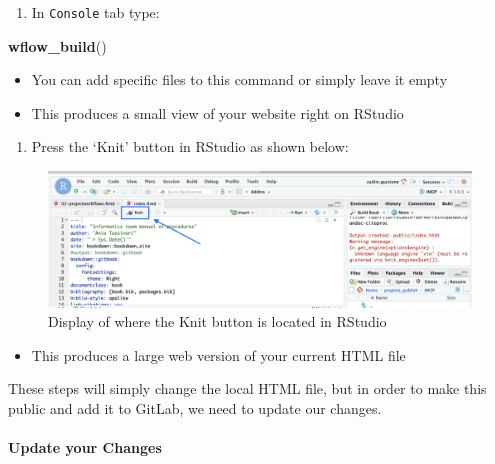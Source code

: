 \documentclass[openany]{article}
\newenvironment{Shaded}{\begin{snugshade}}{\end{snugshade}}
\newcommand{\KeywordTok}[1]{\textcolor[rgb]{0.13,0.29,0.53}{\textbf{#1}}}
\newcommand{\NormalTok}[1]{#1}
\providecommand{\tightlist}{%
  \setlength{\itemsep}{0pt}\setlength{\parskip}{0pt}}
\let\oldparagraph\paragraph
\renewcommand{\paragraph}[1]{\oldparagraph{#1}\mbox{}}
\begin{document}
\begin{enumerate}
\def\labelenumi{\arabic{enumi}.}
\tightlist
\item
  In \texttt{Console} tab type:
\end{enumerate}

\begin{Shaded}
\begin{Highlighting}[]
\KeywordTok{wflow_build}\NormalTok{()}
\end{Highlighting}
\end{Shaded}

\begin{itemize}
\tightlist
\item
  You can add specific files to this command or simply leave it empty
\item
  This produces a small view of your website right on RStudio
\end{itemize}

\begin{enumerate}
\def\labelenumi{\arabic{enumi}.}
\setcounter{enumi}{1}
\tightlist
\item
  Press the `Knit' button in RStudio as shown below:
\end{enumerate}

\begin{figure}

{\centering \includegraphics[width=0.8\linewidth]{images/Workflow_Photos/knit_arrow} 

}

\caption{ Display of where the Knit button is located in RStudio}\label{fig:d2}
\end{figure}

\begin{itemize}
\tightlist
\item
  This produces a large web version of your current HTML file
\end{itemize}

These steps will simply change the local HTML file, but in order to make this public and add it to GitLab, we need to update our changes.

\hypertarget{update-your-changes}{%
\paragraph{Update your Changes}\label{update-your-changes}}
\end{document}
